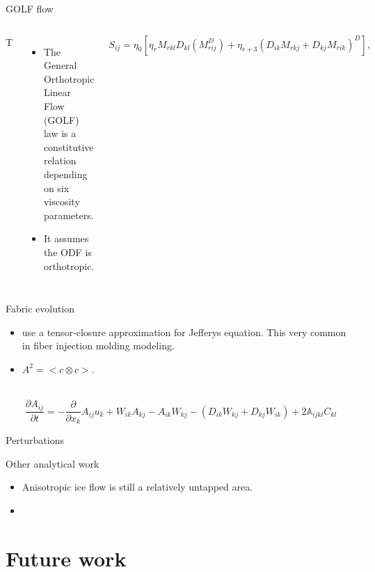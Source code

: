 \documentclass{beamer}
\begin{document}
\begin{frame}{GOLF flow}
   \begin{columns}{T}
   \begin{itemize}
      \item The General Orthotropic Linear Flow (GOLF) law is a constitutive relation depending on six viscosity parameters.
      \item It assumes the ODF is orthotropic.
   \end{itemize}
   \begin{equation}
   S_{ij} = \eta_0 \left[ \eta_r M_{rkl} D_{kl} \left( M_{rij}^D \right)  + \eta_{r+3} \left( D_{ik} M_{rkj} + D_{kj} M_{rik} \right)^D \right],
   \end{equation}
\end{columns}
\end{frame}

\begin{frame}{Fabric evolution}
   \begin{itemize}
      \item \citet{gillet2006} use a tensor-closure approximation for Jefferys equation. This very common in fiber injection molding modeling. 
      \item $A^2= < c \otimes c>$. 
   \end{itemize} \\
   \begin{equation}
      \frac{\partial A_{ij}}{\partial t} = -\frac{\partial}{\partial x_k} A_{ij} u_k + W_{ik} A_{kj} - A_{ik} W_{kj} - (D_{ik}W_{kj} + D_{kj}W_{ik}) + 2 \mathbb{A}_{ijkl} C_{kl}
   \end{equation}

\end{frame}

\begin{frame}{Perturbations}
\end{frame}

\begin{frame}{Other analytical work}
   \begin{itemize}
      \item Anisotropic ice flow is still a relatively untapped area.
      \item 
   \end{itemize}
\end{frame}

\section{Future work}
\end{document}
